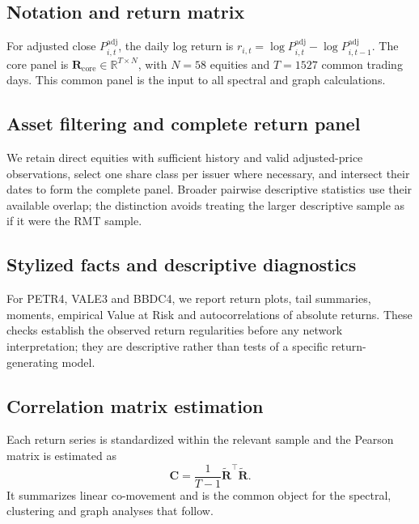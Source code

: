 \subsection{Notation and return matrix}
\label{subsec:notation}

For adjusted close $P^{\mathrm{adj}}_{i,t}$, the daily log return is $r_{i,t}=\log P^{\mathrm{adj}}_{i,t}-\log P^{\mathrm{adj}}_{i,t-1}$. The core panel is $\mathbf{R}_{\mathrm{core}}\in\mathbb{R}^{T\times N}$, with $N=58$ equities and $T=1527$ common trading days. This common panel is the input to all spectral and graph calculations.

\subsection{Asset filtering and complete return panel}
\label{subsec:asset_filtering}

We retain direct equities with sufficient history and valid adjusted-price observations, select one share class per issuer where necessary, and intersect their dates to form the complete panel. Broader pairwise descriptive statistics use their available overlap; the distinction avoids treating the larger descriptive sample as if it were the RMT sample.

\subsection{Stylized facts and descriptive diagnostics}
\label{subsec:stylized_method}

For PETR4, VALE3 and BBDC4, we report return plots, tail summaries, moments, empirical Value at Risk and autocorrelations of absolute returns. These checks establish the observed return regularities before any network interpretation; they are descriptive rather than tests of a specific return-generating model.

\subsection{Correlation matrix estimation}
\label{subsec:correlation_method}

Each return series is standardized within the relevant sample and the Pearson matrix is estimated as
\begin{equation}
\mathbf{C}=\frac{1}{T-1}\widetilde{\mathbf{R}}^{\top}\widetilde{\mathbf{R}}.
\end{equation}
It summarizes linear co-movement and is the common object for the spectral, clustering and graph analyses that follow.


